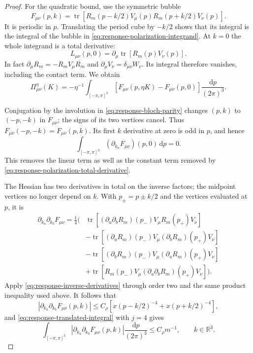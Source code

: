 \documentclass[11pt,letterpaper,reqno]{amsart}
\newcommand{\R}{\mathbb R}
\newcommand{\dd}{\mathrm d}
\DeclareMathOperator{\tr}{tr}
\begin{document}
\begin{proof}
For the quadratic bound, use the symmetric bubble
\[
 F_{\mu\nu}(p,k)=
 \tr[R_m(p-k/2)V_\mu(p)R_m(p+k/2)V_\nu(p)].
\]
It is periodic in $p$. Translating the period cube by $-k/2$
shows that its integral is the integral of the bubble in
\eqref{eq:response-polarization-integrand}. At $k=0$ the
whole integrand is a total derivative:
\begin{equation}\label{eq:response-polarization-total-derivative}
 L_{\mu\nu}(p,0)=
    \partial_\mu\tr[R_m(p)V_\nu(p)].
\end{equation}
In fact $\partial_\mu R_m=-R_mV_\mu R_m$ and
$\partial_\mu V_\nu=\delta_{\mu\nu}W_\nu$. Its integral
therefore vanishes, including the contact term. We obtain
\begin{equation}\label{eq:response-polarization-subtracted}
 \Pi^\eta_{\mu\nu}(K)=
     -\eta^{-1}\int_{[-\pi,\pi]^3}
          [F_{\mu\nu}(p,\eta K)-F_{\mu\nu}(p,0)]
                                      \frac{\dd p}{(2\pi)^3}.
\end{equation}

Conjugation by the involution in
\eqref{eq:response-bloch-parity} changes $(p,k)$ to $(-p,-k)$
in $F_{\mu\nu}$; the signs of its two vertices cancel.
Thus $F_{\mu\nu}(-p,-k)=F_{\mu\nu}(p,k)$.
Its first $k$ derivative at zero is odd in $p$, and hence
\begin{equation}\label{eq:response-polarization-parity-cancellation}
 \int_{[-\pi,\pi]^3}
              (\partial_{k_a}F_{\mu\nu})(p,0)\,\dd p=0.
\end{equation}
This removes the linear term as well as the constant term
removed by \eqref{eq:response-polarization-total-derivative}.

The Hessian has two derivatives in total on the inverse factors;
the midpoint vertices no longer depend on $k$. With $p_\pm=p\pm k/2$
and the vertices evaluated at $p$, it is
\begin{align*}
 \partial_{k_a}\partial_{k_b}F_{\mu\nu}
 =\tfrac14\big(&
  \tr[(\partial_a\partial_bR_m)(p_-)V_\mu R_m(p_+)V_\nu]\\
 &-\tr[(\partial_aR_m)(p_-)V_\mu(\partial_bR_m)(p_+)V_\nu]\\
 &-\tr[(\partial_bR_m)(p_-)V_\mu(\partial_aR_m)(p_+)V_\nu]\\
 &+\tr[R_m(p_-)V_\mu(\partial_a\partial_bR_m)(p_+)V_\nu]\big).
\end{align*}
Apply \eqref{eq:response-inverse-derivatives} through order two
and the same product inequality used above. It follows that
\[
 |\partial_{k_a}\partial_{k_b}F_{\mu\nu}(p,k)|
               \le C_\rho[x(p-k/2)^{-4}+x(p+k/2)^{-4}],
\]
and \eqref{eq:response-translated-integral} with $j=4$ gives
\begin{equation}\label{eq:response-polarization-hessian}
 \int_{[-\pi,\pi]^3}
     |\partial_{k_a}\partial_{k_b}F_{\mu\nu}(p,k)|
                             \frac{\dd p}{(2\pi)^3}
                  \le C_\rho m^{-1},\qquad k\in\R^3.
\end{equation}


\end{proof}
\end{document}
